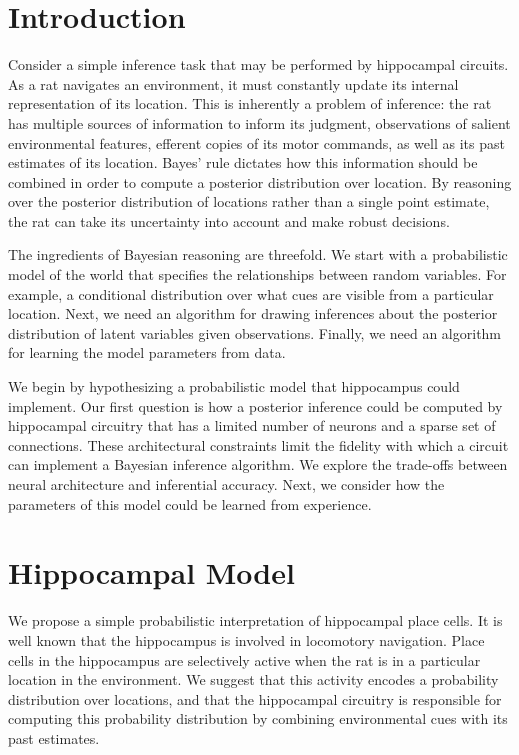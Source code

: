 \clearpage
\section{Introduction} 
Consider a simple inference task that may be performed by hippocampal circuits. 
As a rat navigates an environment, it must constantly update its internal 
representation of its location. This is inherently a problem of inference: 
the rat has multiple sources of information to inform its judgment, observations
of salient environmental features, efferent copies of its motor commands, as
well as its past estimates of its location. Bayes' rule dictates how this 
information should be combined in order to compute a posterior distribution 
over location. By reasoning over the posterior distribution of locations 
rather than a single point estimate, the rat can take its uncertainty into 
account and make robust decisions. 

The ingredients of Bayesian reasoning are threefold. We start with a 
probabilistic model of the world that specifies the relationships between
random variables. For example, a conditional distribution over what cues 
are visible from a particular location. Next, we need an algorithm for 
drawing inferences about the posterior distribution of latent variables 
given observations. Finally, we need an algorithm for learning the 
model parameters from data. 

We begin by hypothesizing a probabilistic model that hippocampus could implement.
Our first question is how a posterior inference could be computed by hippocampal 
circuitry that has a limited number of neurons and a sparse set of connections.
These architectural constraints limit the fidelity with which a circuit can 
implement a Bayesian inference algorithm. We explore the trade-offs between 
neural architecture and inferential accuracy. Next, we consider how the 
parameters of this model could be learned from experience.

\section{Hippocampal Model}
We propose a simple probabilistic interpretation of hippocampal place cells.
It is well known that the hippocampus is involved in locomotory navigation.
Place cells in the hippocampus are selectively active when the rat is 
in a particular location in the environment. We suggest that this activity 
encodes a probability distribution over locations, and that the hippocampal 
circuitry is responsible for computing this probability distribution by 
combining environmental cues with its past estimates. 

